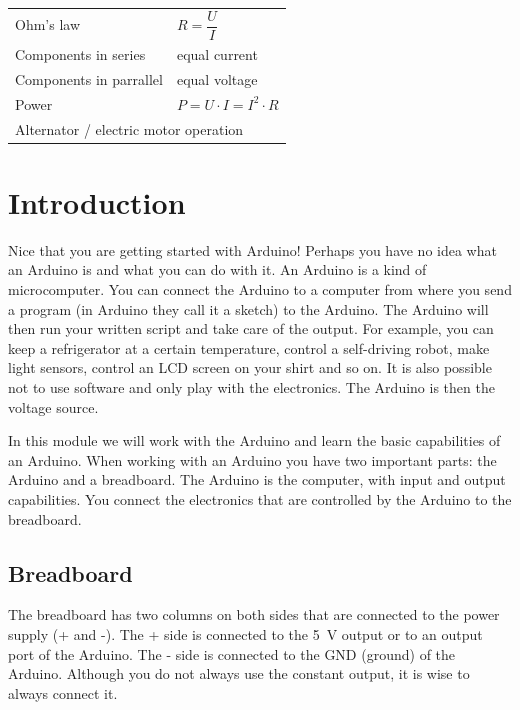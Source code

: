 \documentclass{arduino}
\begin{document}
\begin{tabular}{@{}ll@{}}
Ohm's law                                                 &  $R = \dfrac{U}{I}$            \\
Components in series                                      &  equal current                 \\
Components in parrallel                                   &  equal voltage                 \\
Power                                                     &  $P = U \cdot I = I^2 \cdot R$ \\
\multicolumn{2}{l}{Alternator / electric motor operation} \\
\end{tabular}

\newpage

\section{Introduction}

Nice that you are getting started with Arduino! Perhaps you have no idea what an Arduino is and what you can do with it. An Arduino is a kind of microcomputer. You can connect the Arduino to a computer from where you send a program (in Arduino they call it a sketch) to the Arduino. The Arduino will then run your written script and take care of the output. For example, you can keep a refrigerator at a certain temperature, control a self-driving robot, make light sensors, control an LCD screen on your shirt and so on. It is also possible not to use software and only play with the electronics. The Arduino is then the voltage source.

In this module we will work with the Arduino and learn the basic capabilities of an Arduino. When working with an Arduino you have two important parts: the Arduino and a breadboard. The Arduino is the computer, with input and output capabilities. You connect the electronics that are controlled by the Arduino to the breadboard.

\subsection{Breadboard}

The breadboard has two columns on both sides that are connected to the power supply (+ and -). The + side is connected to the \SI{5}{\volt} output or to an output port of the Arduino. The - side is connected to the GND (ground) of the Arduino. Although you do not always use the constant output, it is wise to always connect it.
\end{document}
